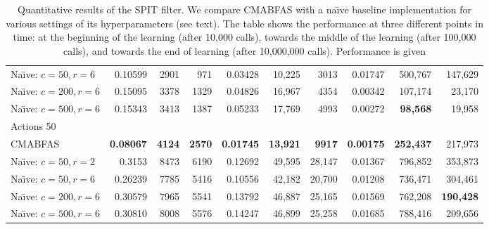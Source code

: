 \documentclass{llncs}
\begin{document}
\begin{sidewaystable}
\begin{center}
\begin{tabular}{|l|rrr|rrr|rrr|}
\hspace*{0.5cm}Na\"{\i}ve: $c=50, r=6$     & 0.10599       & 2901      & 971       & 0.03428       & 10,225     & 3013       & 0.01747       & 500,767    & 147,629    \\
\hspace*{0.5cm}Na\"{\i}ve: $c=200, r=6$    & 0.15095       & 3378      & 1329      & 0.04826       & 16,967     & 4354       & 0.00342       & 107,174    & 23,170     \\
\hspace*{0.5cm}Na\"{\i}ve: $c=500, r=6$    & 0.15343       & 3413      & 1387      & 0.05233       & 17,769     & 4993       & 0.00272       &{\bf 98,568}& 19,958     \\
\hline
Actions 50                            &               &           &           &               &            &            &               &             &         \\
\hspace*{0.5cm}CMABFAS                & {\bf 0.08067} & {\bf 4124}& {\bf 2570}& {\bf 0.01745} &{\bf 13,921}&{\bf 9917}  & {\bf 0.00175} &{\bf 252,437}& 217,973 \\
\hspace*{0.5cm}Na\"{\i}ve: $c=50, r=2$     & 0.3153        & 8473      & 6190      & 0.12692       & 49,595     & 28,147     & 0.01367       & 796,852     & 353,873 \\
\hspace*{0.5cm}Na\"{\i}ve: $c=50, r=6$     & 0.26239       & 7785      & 5416      & 0.10556       & 42,182     & 20,700     & 0.01208       & 736,471     & 304,461 \\
\hspace*{0.5cm}Na\"{\i}ve: $c=200, r=6$    & 0.30579       & 7965      & 5541      & 0.13792       & 46,887     & 25,165     & 0.01569       & 762,208     & {\bf 190,428} \\
\hspace*{0.5cm}Na\"{\i}ve: $c=500, r=6$    & 0.30810       & 8008      & 5576      & 0.14247       & 46,899     & 25,258     & 0.01685       & 788,416     & 209,656\\
\hline
\end{tabular}
\end{center}
\caption{Quantitative results of the SPIT filter. We compare CMABFAS with a na\"{\i}ve baseline implementation for various settings of its hyperparameters (see text). The table shows the performance at three different points in time: at the beginning of the learning (after 10,000
calls), towards the middle of the learning (after 100,000 calls), and towards the end of learning (after 10,000,000 calls). Performance is given
}
\end{sidewaystable}
\end{document}
